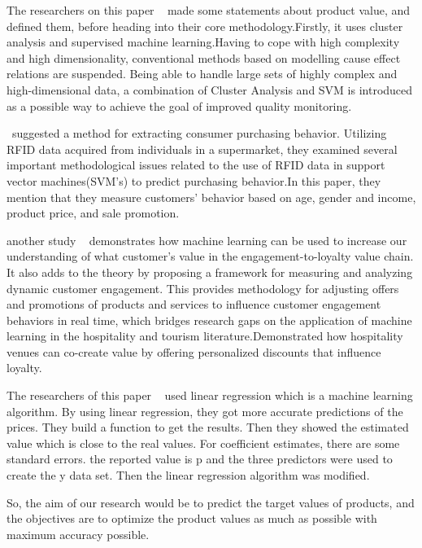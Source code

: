 \documentclass[conference]{IEEEtran}
\begin{document}
The  researchers on this paper ~\cite{wuest2014approach}  made  some  statements  about  product  value,  and  defined  them, before  heading  into  their  core  methodology.Firstly,  it  uses  cluster  analysis  and supervised  machine  learning.Having  to  cope  with  high  complexity  and  high dimensionality, conventional methods based on modelling cause effect relations are suspended. Being able to handle large sets of highly complex and high-dimensional data, a combination of Cluster Analysis and SVM is introduced as a possible way to achieve the goal of improved quality monitoring. 

~\cite{zuo2016prediction}suggested  a  method  for  extracting  consumer  purchasing  behavior. Utilizing RFID data acquired from individuals in a supermarket, they examined several important methodological issues related to the use of RFID data in support vector machines(SVM's) to predict purchasing behavior.In this paper, they mention that they measure customers’ behavior based on age, gender and income, product price, and sale promotion.

another study ~\cite{aluri2019using} demonstrates how machine learning can be used to increase our understanding of what customer’s value in the engagement-to-loyalty value chain. It also adds to the theory by proposing a   framework   for   measuring   and   analyzing   dynamic customer engagement.   This   provides methodology for adjusting offers and promotions of products and services to influence customer engagement behaviors  in real time,  which bridges  research  gaps  on  the  application  of machine learning in  the  hospitality  and tourism literature.Demonstrated how  hospitality  venues can co-create  value  by  offering  personalized  discounts  that  influence  loyalty.

The researchers of this paper ~\cite{an2019oil} used linear regression which is a machine learning algorithm. By using linear regression, they got more accurate predictions of the prices. They build a function to get the results. Then they showed the estimated value which is close to the real values. For coefficient 
estimates, there are some standard errors. the reported value is p and the three predictors were used to create the y data set. Then the linear regression algorithm was modified. 

So, the aim of our research would be to predict the target values of products, and the objectives are to optimize the product values as much as possible with maximum accuracy possible. 
\end{document}
